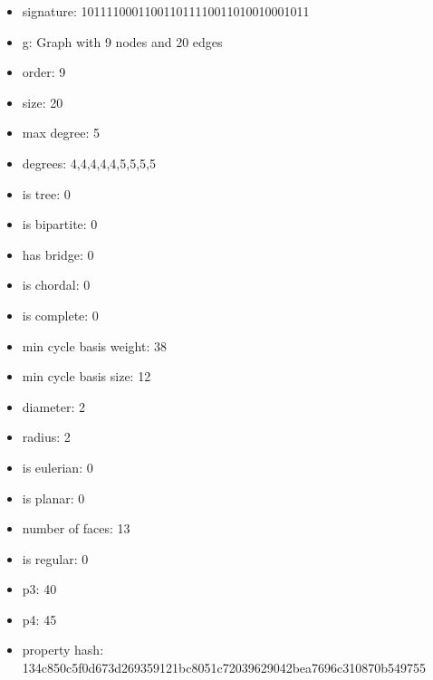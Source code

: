 \newpage
\begin{figure}
\end{figure}
\begin{itemize}
\item signature: 101111000110011011110011010010001011
\item g: Graph with 9 nodes and 20 edges
\item order: 9
\item size: 20
\item max degree: 5
\item degrees: 4,4,4,4,4,5,5,5,5
\item is tree: 0
\item is bipartite: 0
\item has bridge: 0
\item is chordal: 0
\item is complete: 0
\item min cycle basis weight: 38
\item min cycle basis size: 12
\item diameter: 2
\item radius: 2
\item is eulerian: 0
\item is planar: 0
\item number of faces: 13
\item is regular: 0
\item p3: 40
\item p4: 45
\item property hash: 134c850c5f0d673d269359121bc8051c72039629042bea7696c310870b549755
\end{itemize}
